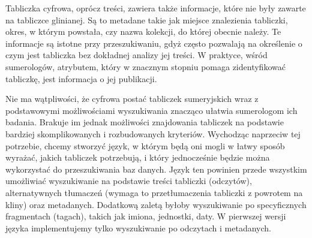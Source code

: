 Tabliczka cyfrowa, oprócz treści, zawiera także informacje, które nie były zawarte na tabliczce glinianej. 
Są to metadane takie jak miejsce znalezienia tabliczki, okres, w którym powstała, czy nazwa kolekcji, do której obecnie należy. 
Te informacje są istotne przy przeszukiwaniu, gdyż często pozwalają na określenie o czym jest tabliczka bez dokładnej analizy 
jej treści. 
W praktyce, wśród sumerologów, atrybutem, który w znacznym stopniu pomaga zidentyfikować tabliczkę, jest informacja o jej publikacji.

Nie ma wątpliwości, że cyfrowa postać tabliczek sumeryjskich wraz z podstawowymi możliwościami wyszukiwania znacząco
ułatwia sumerologom ich badania. Brakuje im jednak możliwości znajdowania tabliczek na podstawie
bardziej skomplikowanych i rozbudowanych kryteriów.
Wychodząc naprzeciw tej potrzebie, chcemy stworzyć język, w którym będą oni mogli w łatwy sposób wyrażać, 
jakich tabliczek potrzebują, i który jednocześnie będzie można wykorzystać do przeszukiwania baz danych. 
Język ten powinien przede wszystkim umożliwiać wyszukiwanie na podstawie treści tabliczki (odczytów), 
alternatywnych tłumaczeń (wymaga to przetłumaczenia tabliczki z powrotem na kliny) oraz metadanych.
Dodatkową zaletą byłoby wyszukiwanie po specyficznych fragmentach (tagach), takich jak imiona, jednostki, daty.
W pierwszej wersji języka implementujemy tylko wyszukiwanie po odczytach i metadanych.